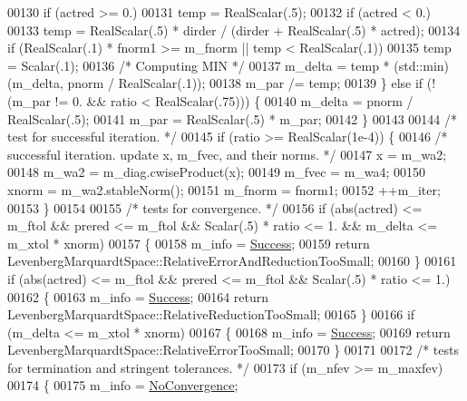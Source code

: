 \begin{DoxyCode}
00130         \textcolor{keywordflow}{if} (actred >= 0.)
00131             temp = RealScalar(.5);
00132         \textcolor{keywordflow}{if} (actred < 0.)
00133             temp = RealScalar(.5) * dirder / (dirder + RealScalar(.5) * actred);
00134         \textcolor{keywordflow}{if} (RealScalar(.1) * fnorm1 >= m\_fnorm || temp < RealScalar(.1))
00135             temp = Scalar(.1);
00136         \textcolor{comment}{/* Computing MIN */}
00137         m\_delta = temp * (std::min)(m\_delta, pnorm / RealScalar(.1));
00138         m\_par /= temp;
00139     \} \textcolor{keywordflow}{else} \textcolor{keywordflow}{if} (!(m\_par != 0. && ratio < RealScalar(.75))) \{
00140         m\_delta = pnorm / RealScalar(.5);
00141         m\_par = RealScalar(.5) * m\_par;
00142     \}
00143 
00144     \textcolor{comment}{/* test for successful iteration. */}
00145     \textcolor{keywordflow}{if} (ratio >= RealScalar(1e-4)) \{
00146         \textcolor{comment}{/* successful iteration. update x, m\_fvec, and their norms. */}
00147         x = m\_wa2;
00148         m\_wa2 = m\_diag.cwiseProduct(x);
00149         m\_fvec = m\_wa4;
00150         xnorm = m\_wa2.stableNorm();
00151         m\_fnorm = fnorm1;
00152         ++m\_iter;
00153     \}
00154 
00155     \textcolor{comment}{/* tests for convergence. */}
00156     \textcolor{keywordflow}{if} (abs(actred) <= m\_ftol && prered <= m\_ftol && Scalar(.5) * ratio <= 1. && m\_delta <= m\_xtol * xnorm)
00157     \{
00158        m\_info = \hyperlink{group__enums_gga85fad7b87587764e5cf6b513a9e0ee5ea52581b035f4b59c203b8ff999ef5fcea}{Success};
00159       \textcolor{keywordflow}{return} LevenbergMarquardtSpace::RelativeErrorAndReductionTooSmall;
00160     \}
00161     \textcolor{keywordflow}{if} (abs(actred) <= m\_ftol && prered <= m\_ftol && Scalar(.5) * ratio <= 1.) 
00162     \{
00163       m\_info = \hyperlink{group__enums_gga85fad7b87587764e5cf6b513a9e0ee5ea52581b035f4b59c203b8ff999ef5fcea}{Success};
00164       \textcolor{keywordflow}{return} LevenbergMarquardtSpace::RelativeReductionTooSmall;
00165     \}
00166     \textcolor{keywordflow}{if} (m\_delta <= m\_xtol * xnorm)
00167     \{
00168       m\_info = \hyperlink{group__enums_gga85fad7b87587764e5cf6b513a9e0ee5ea52581b035f4b59c203b8ff999ef5fcea}{Success};
00169       \textcolor{keywordflow}{return} LevenbergMarquardtSpace::RelativeErrorTooSmall;
00170     \}
00171 
00172     \textcolor{comment}{/* tests for termination and stringent tolerances. */}
00173     \textcolor{keywordflow}{if} (m\_nfev >= m\_maxfev) 
00174     \{
00175       m\_info = \hyperlink{group__enums_gga85fad7b87587764e5cf6b513a9e0ee5eaba1c8763d1179778070f365ecc4157a8}{NoConvergence};

\end{DoxyCode}
